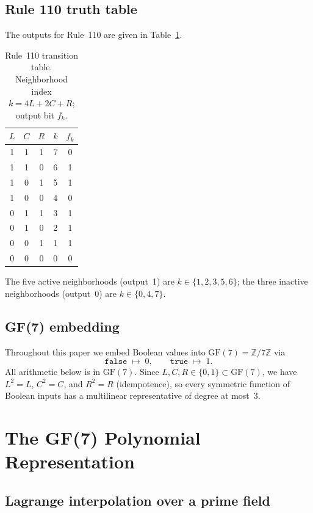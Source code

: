 \documentclass[11pt]{article}
\theoremstyle{remark}
\begin{document}
\subsection{Rule 110 truth table}

The outputs for Rule~110 are given in Table~\ref{tab:rule110}.

\begin{table}[h]
\centering
\caption{Rule~110 transition table.
Neighborhood index $k = 4L+2C+R$; output bit $f_k$.}
\label{tab:rule110}
\begin{tabular}{ccc|cc}
\toprule
$L$ & $C$ & $R$ & $k$ & $f_k$ \\
\midrule
1 & 1 & 1 & 7 & 0 \\
1 & 1 & 0 & 6 & 1 \\
1 & 0 & 1 & 5 & 1 \\
1 & 0 & 0 & 4 & 0 \\
0 & 1 & 1 & 3 & 1 \\
0 & 1 & 0 & 2 & 1 \\
0 & 0 & 1 & 1 & 1 \\
0 & 0 & 0 & 0 & 0 \\
\bottomrule
\end{tabular}
\end{table}

The five active neighborhoods (output~1) are $k \in \{1,2,3,5,6\}$; the three inactive
neighborhoods (output~0) are $k \in \{0,4,7\}$.

\subsection{GF(7) embedding}

Throughout this paper we embed Boolean values into $\mathrm{GF}(7) = \mathbb{Z}/7\mathbb{Z}$
via
\[
  \mathtt{false} \;\mapsto\; 0, \qquad \mathtt{true} \;\mapsto\; 1.
\]
All arithmetic below is in $\mathrm{GF}(7)$.
Since $L, C, R \in \{0,1\} \subset \mathrm{GF}(7)$, we have
$L^2 = L$, $C^2 = C$, and $R^2 = R$ (idempotence), so every symmetric function
of Boolean inputs has a multilinear representative of degree at most~3.

\section{The GF(7) Polynomial Representation}
\label{sec:polynomial}

\subsection{Lagrange interpolation over a prime field}
\end{document}
